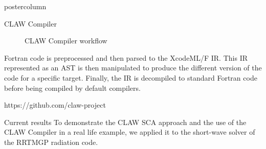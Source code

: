 \documentclass{beamer}
\begin{document}
\begin{frame}
\begin{columns}
\begin{column}{.57\textwidth}
\begin{beamercolorbox}[center]{postercolumn}
\begin{minipage}{.98\textwidth}
{\begin{myblock}{CLAW Compiler}
\begin{figure}
  \caption[CLAW Compiler workflow]{CLAW Compiler workflow}
  \label{fig:clawfc}
\end{figure}

Fortran code is preprocessed and then parsed to the XcodeML/F IR. This IR
represented as an AST is then manipulated
to produce the different version of the code for a specific target. Finally, the
IR is decompiled to standard Fortran code before being compiled by default
compilers.

 https://github.com/claw-project

\end{myblock}\vfill

%
%
\begin{myblock}{Current results}
To demonstrate the CLAW SCA approach and the use of the CLAW Compiler in a real
life example, we applied it to the short-wave solver of the RRTMGP radiation
code.


\end{myblock}}
\end{minipage}
\end{beamercolorbox}
\end{column}
\end{columns}
\end{frame}
\end{document}
